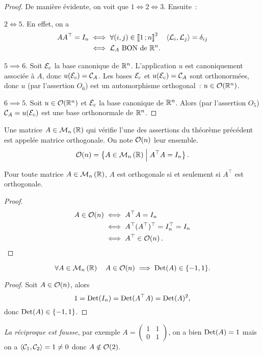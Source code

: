 \begin{proof}
  De manière évidente, on voit que $1 \iff 2 \iff 3$. Ensuite~:

  $2 \iff 5$. En effet, on a
  \begin{align}
   A A^\top = I_n &\iff \forall (i,j) \in \mathopen{\llbracket}1\mathclose{}\mathpunct{};n\mathclose{\rrbracket}^2 \quad \left\langle{\mathcal{L}_i},{\mathcal{L}_j}\right\rangle=\delta_{ij} \\
   &\iff \mathcal{L}_A \text{~BON de~} \mathbb{R}^n.
  \end{align}

  $5 \implies 6$. Soit $\mathcal{E}_c$ la base canonique de $\mathbb{R}^n$. L'application $u$ est canoniquement associée à $A$, donc $u(\mathcal{E}_c)=\mathcal{C}_A$. Les bases $\mathcal{E}_c$ et $u(\mathcal{E}_c)=\mathcal{C}_A$ sont orthonormées, donc $u$ (par l'assertion $O_6$) est un automorphisme orthogonal~: $u \in \mathcal{O}\!\left(\mathbb{R}^n\right)$.

  $6 \implies 5$. Soit $u \in \mathcal{O}\!\left(\mathbb{R}^n\right)$ et $\mathcal{E}_c$ la base canonique de $\mathbb{R}^n$. Alors (par l'assertion $O_5$) $\mathcal{C}_A = u(\mathcal{E}_c)$ est une base orthonormale de $\mathbb{R}^n$.
\end{proof}

\begin{defdef}
  Une matrice $A \in \mathcal{M}_{n}\left(\mathbb{R}\right)$ qui vérifie l'une des assertions du théorème précédent est appelée matrice orthogonale. On note $\mathcal{O}\!\left(n\right)$ leur ensemble.
  \begin{equation}
    \mathcal{O}\!\left(n\right)=\left\{A \in \mathcal{M}_{n}\left(\mathbb{R}\right)\mathrel{}\middle|\mathrel{}A^\top A = I_n\right\}.
  \end{equation}
\end{defdef}
\begin{prop}
  Pour toute matrice $A \in \mathcal{M}_{n}\left(\mathbb{R}\right)$, $A$ est orthogonale si et seulement si $A^\top$ est orthogonale.
\end{prop}
\begin{proof}
  \begin{align}
    A \in \mathcal{O}\!\left(n\right) &\iff A^\top A = I_n \\
    & \iff A^\top (A^\top)^\top = I_n^\top=I_n \\
    & \iff A^\top \in \mathcal{O}\!\left(n\right).
  \end{align}
\end{proof}
\begin{prop}
  \begin{equation}
    \forall A \in \mathcal{M}_{n}\left(\mathbb{R}\right) \quad A \in \mathcal{O}\!\left(n\right) \implies \operatorname{Det}(A) \in \{-1, 1\}.
  \end{equation}
\end{prop}
\begin{proof}
  Soit $A \in \mathcal{O}\!\left(n\right)$, alors
  \begin{equation}
    1 = \operatorname{Det}(I_n) = \operatorname{Det}(A^\top A) = \operatorname{Det}(A)^2,
  \end{equation}
  donc $\operatorname{Det}(A) \in \{-1, 1\}$.
\end{proof}
\emph{La réciproque est fausse}, par exemple $A = \begin{pmatrix} 1 & 1 \\ 0 & 1 \end{pmatrix}$, on a bien $\operatorname{Det}(A)=1$ mais on a $\left\langle{\mathcal{C}_1},{\mathcal{C}_2}\right\rangle=1 \neq 0$ donc $A \notin \mathcal{O}\!\left(2\right)$.

